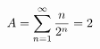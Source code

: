 \documentclass[preview]{standalone}
\begin{document}
\begin{align*}
\special{dvisvgm:raw <g id='unique000'>}A=\displaystyle\sum_{n=1}^{\infty}\dfrac{n}{2^n}=2\special{dvisvgm:raw </g>}
\end{align*}
\end{document}
